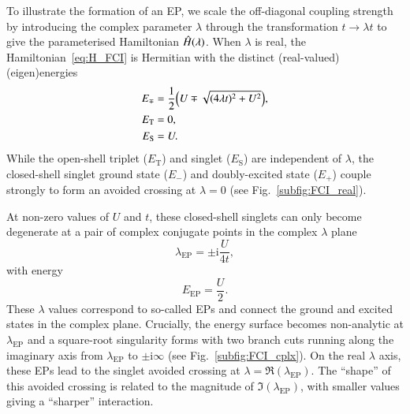 \documentclass[aps,prb,reprint,noshowkeys,linenumbers,superscriptaddress]{revtex4-1}
\newcommand{\hugh}[1]{\textcolor{hughgreen}{#1}}
\newcommand{\hH}{\Hat{H}}
\renewcommand{\i}{\mathrm{i}} %
\begin{document}
To illustrate the formation of an EP, we scale the off-diagonal coupling strength by introducing the complex parameter $\lambda$ through the transformation $t\rightarrow \lambda t$
\hugh{to give the parameterised Hamiltonian $\hH(\lambda)$.}
When $\lambda$ is real, the Hamiltonian~\eqref{eq:H_FCI} is Hermitian with the distinct (real-valued) (eigen)energies
\begin{subequations}
\begin{align}
E_{\mp} &= \frac{1}{2} \qty(U \mp \sqrt{ (4 \lambda t)^2 + U^2 } ),
\label{eq:singletE}
\\
E_{\text{T}} &= 0,
\\
E_{\text{S}} &= U.
\end{align}
\end{subequations}
While the open-shell triplet ($E_{\text{T}}$) and singlet ($E_{\text{S}}$) are independent of $\lambda$, the closed-shell singlet ground state ($E_{-}$) and doubly-excited state ($E_{+}$) couple strongly to form an avoided crossing at $\lambda=0$ (see Fig.~\ref{subfig:FCI_real}).

At non-zero values of $U$ and $t$, these closed-shell singlets can only become degenerate at a pair of complex conjugate points in the complex $\lambda$ plane 
\begin{equation}
\lambda_{\text{EP}} = \pm  \i \frac{U}{4t},
\end{equation}
with energy
\begin{equation}
\label{eq:E_EP}
	E_\text{EP} = \frac{U}{2}.
\end{equation}
These $\lambda$ values correspond to so-called EPs and connect the ground and excited states in the complex plane.
Crucially, the energy surface becomes non-analytic at $\lambda_{\text{EP}}$ and a square-root singularity forms with two branch cuts running along the imaginary axis from $\lambda_{\text{EP}}$  to $\pm \i \infty$ (see Fig.~\ref{subfig:FCI_cplx}).
On the real $\lambda$ axis, these EPs lead to the singlet avoided crossing at $\lambda = \Re(\lambda_{\text{EP}})$.
The ``shape'' of this avoided crossing is related to the magnitude of $\Im(\lambda_{\text{EP}})$, with smaller values giving a ``sharper'' interaction.
\end{document}
